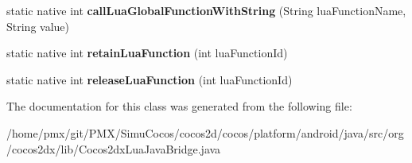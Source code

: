 \begin{DoxyCompactItemize}
static native int {\bfseries call\+Lua\+Global\+Function\+With\+String} (String lua\+Function\+Name, String value)
\item 
\mbox{\label{classorg_1_1cocos2dx_1_1lib_1_1Cocos2dxLuaJavaBridge_aeaa9fb66524416cd7b7697705c1bcb0a}} 
static native int {\bfseries retain\+Lua\+Function} (int lua\+Function\+Id)
\item 
\mbox{\label{classorg_1_1cocos2dx_1_1lib_1_1Cocos2dxLuaJavaBridge_a392a35daa8a6cbf4d334fabe968a6603}} 
static native int {\bfseries release\+Lua\+Function} (int lua\+Function\+Id)
\end{DoxyCompactItemize}


The documentation for this class was generated from the following file\+:\begin{DoxyCompactItemize}
\item 
/home/pmx/git/\+P\+M\+X/\+Simu\+Cocos/cocos2d/cocos/platform/android/java/src/org/cocos2dx/lib/Cocos2dx\+Lua\+Java\+Bridge.\+java\end{DoxyCompactItemize}
